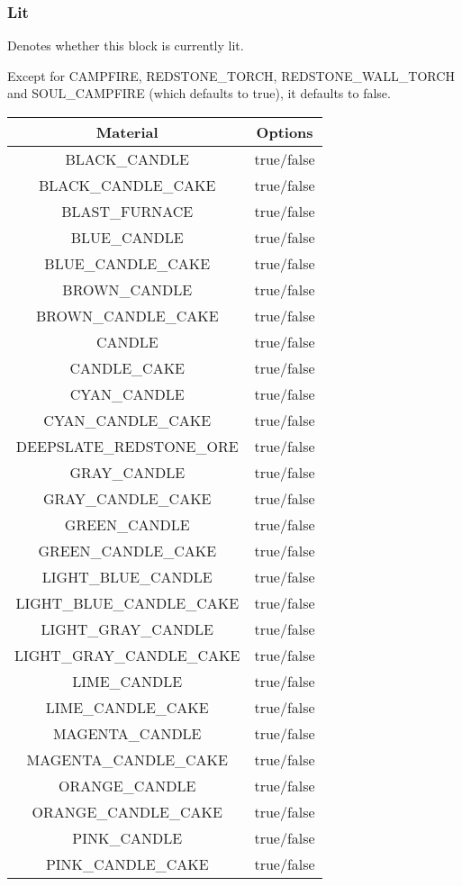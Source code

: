 \subsubsection{Lit}
Denotes whether this block is currently lit.

Except for CAMPFIRE, REDSTONE\_TORCH, REDSTONE\_WALL\_TORCH and SOUL\_CAMPFIRE (which defaults to true), it defaults to false.

\begin{longtable}{ |c|c| }
	\hline
	Material & Options \\
	\hline
	\endhead
	BLACK\_CANDLE & true/false \\
	BLACK\_CANDLE\_CAKE & true/false \\
	BLAST\_FURNACE & true/false \\
	BLUE\_CANDLE & true/false \\
	BLUE\_CANDLE\_CAKE & true/false \\
	BROWN\_CANDLE & true/false \\
	BROWN\_CANDLE\_CAKE & true/false \\
	CANDLE & true/false \\
	CANDLE\_CAKE & true/false \\
	CYAN\_CANDLE & true/false \\
	CYAN\_CANDLE\_CAKE & true/false \\
	DEEPSLATE\_REDSTONE\_ORE & true/false \\
	GRAY\_CANDLE & true/false \\
	GRAY\_CANDLE\_CAKE & true/false \\
	GREEN\_CANDLE & true/false \\
	GREEN\_CANDLE\_CAKE & true/false \\
	LIGHT\_BLUE\_CANDLE & true/false \\
	LIGHT\_BLUE\_CANDLE\_CAKE & true/false \\
	LIGHT\_GRAY\_CANDLE & true/false \\
	LIGHT\_GRAY\_CANDLE\_CAKE & true/false \\
	LIME\_CANDLE & true/false \\
	LIME\_CANDLE\_CAKE & true/false \\
	MAGENTA\_CANDLE & true/false \\
	MAGENTA\_CANDLE\_CAKE & true/false \\
	ORANGE\_CANDLE & true/false \\
	ORANGE\_CANDLE\_CAKE & true/false \\
	PINK\_CANDLE & true/false \\
	PINK\_CANDLE\_CAKE & true/false \\

\end{longtable}
